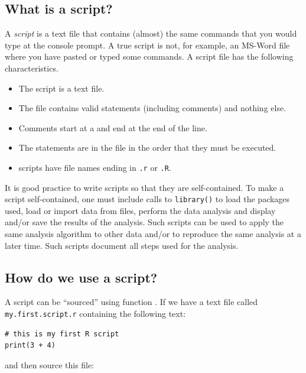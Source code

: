 \documentclass[krantz2]{krantz}\usepackage{knitr}
\begin{document}
\subsection{What is a script?}\label{sec:script:what:is}
A \textit{script} is a text file that contains (almost) the same commands that you would type at the console prompt. A true script is not, for example, an MS-Word file where you have pasted or typed some \Rlang commands. A script file has the following characteristics.
\begin{itemize}
  \item The script is a text file.
  \item The file contains valid \Rlang statements (including comments) and nothing else.
  \item Comments start at a \code{\#} and end at the end of the line.
  \item The \Rlang statements are in the file in the order that they must be executed.
  \item \Rlang scripts have file names ending in \texttt{.r} or \texttt{.R}.
\end{itemize}

It is good practice to write scripts so that they are self-contained. To make a script self-contained, one must include calls to \texttt{library()} to load the packages used, load or import data from files, perform the data analysis and display and/or save the results of the analysis. Such scripts can be used to apply the same analysis algorithm to other data and/or to reproduce the same analysis at a later time. Such scripts document all steps used for the analysis.



\subsection{How do we use a script?}\label{sec:script:using}

A script can be ``sourced'' using function . If we have a text file called \texttt{my.first.script.r} containing the following text:
\begin{shaded}
\footnotesize
\begin{verbatim}
# this is my first R script
print(3 + 4)
\end{verbatim}
\end{shaded}

and then source this file:
\end{document}
